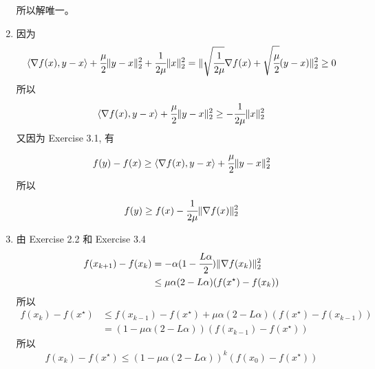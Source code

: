 \documentclass[11pt,letter,notitlepage]{article}
\begin{document}
\begin{solution}
\begin{enumerate}
              所以解唯一。
        \item 因为
              $$\langle\nabla f(x),y-x \rangle+\cfrac{\mu}{2}\|y-x\|_2^2+\cfrac{1}{2\mu}\|x\|_2^2
                  = \|\sqrt{\cfrac{1}{2\mu}}\nabla f(x)+\sqrt{\cfrac{\mu}{2}}(y-x)\|_2^2
                  \ge 0$$
              所以
              $$\langle\nabla f(x),y-x \rangle+\cfrac{\mu}{2}\|y-x\|_2^2
                  \ge -\cfrac{1}{2\mu}\|x\|_2^2$$
              又因为 Exercise 3.1, 有
              $$f(y)-f(x)\ge\langle\nabla f(x),y-x\rangle+\cfrac{\mu}{2}\|y-x\|_2^2$$
              所以
              $$ f(y)\ge f(x)-\cfrac{1}{2\mu}\|\nabla f(x)\|_2^2$$
        \item 由 Exercise 2.2 和 Exercise 3.4
              $$\begin{aligned}
                      f(x_{k+1})-f(x_k)
                       & =-\alpha (1-\cfrac{L\alpha}{2}) \|\nabla f(x_k)\|_2^2 \\
                       & \le \mu\alpha(2-L\alpha) (f(x^\star)-f(x_k))
                  \end{aligned}$$
              所以
              $$\begin{aligned}
                      f(x_k)-f(x^\star)
                       & \le f(x_{k-1})-f(x^\star) + \mu\alpha(2-L\alpha) (f(x^\star)-f(x_{k-1})) \\
                       & = (1-\mu\alpha(2-L\alpha)) (f(x_{k-1})-f(x^\star))
                  \end{aligned}$$
              所以
              $$ f(x_k)-f(x^\star) \le (1-\mu\alpha(2-L\alpha))^k (f(x_0)-f(x^\star)) $$
    \end{enumerate}
\end{solution}
\newpage
\end{document}
